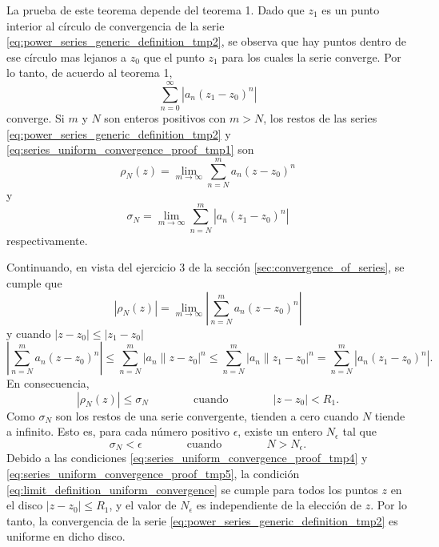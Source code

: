 \documentclass[a4paper]{report}
\begin{document}
La prueba de este teorema depende del teorema 1. Dado que \(z_1\) es un punto interior al círculo de convergencia de la serie \ref{eq:power_series_generic_definition_tmp2}, se observa que hay puntos dentro de ese círculo mas lejanos a \(z_0\) que el punto \(z_1\) para los cuales la serie converge. Por lo tanto, de acuerdo al teorema 1,
\begin{equation}\label{eq:series_uniform_convergence_proof_tmp1}
 \sum_{n=0}^\infty|a_n(z_1-z_0)^n| 
\end{equation}
converge. Si \(m\) y \(N\) son enteros positivos con \(m>N\), los restos de las series \ref{eq:power_series_generic_definition_tmp2} y \ref{eq:series_uniform_convergence_proof_tmp1} son
\begin{equation}\label{eq:series_uniform_convergence_proof_tmp2}
 \rho_N(z)=\lim_{m\to\infty}\sum_{n=N}^m a_n(z-z_0)^n 
\end{equation}
y
\begin{equation}\label{eq:series_uniform_convergence_proof_tmp3}
 \sigma_N=\lim_{m\to\infty}\sum_{n=N}^m|a_n(z_1-z_0)^n| 
\end{equation}
respectivamente.

Continuando, en vista del ejercicio 3 de la sección \ref{sec:convergence_of_series}, se cumple que
\[
 |\rho_N(z)|=\lim_{m\to\infty}\left|\sum_{n=N}^m a_n(z-z_0)^n\right|
\]
y cuando \(|z-z_0|\leq|z_1-z_0|\)
\[
 \left|\sum_{n=N}^m a_n(z-z_0)^n\right|\leq\sum_{n=N}^m|a_n\|z-z_0|^n\leq\sum_{n=N}^m|a_n\|z_1-z_0|^n=\sum_{n=N}^m|a_n(z_1-z_0)^n|.
\]
En consecuencia,
\begin{equation}\label{eq:series_uniform_convergence_proof_tmp4}
 |\rho_N(z)|\leq\sigma_N
 \qquad\qquad\textrm{cuando}\qquad\qquad
 |z-z_0|<R_1.
\end{equation}
Como \(\sigma_N\) son los restos de una serie convergente, tienden a cero cuando \(N\) tiende a infinito. Esto es, para cada número positivo \(\epsilon\), existe un entero \(N_\epsilon\) tal que 
\begin{equation}\label{eq:series_uniform_convergence_proof_tmp5}
 \sigma_N<\epsilon
 \qquad\qquad\textrm{cuando}\qquad\qquad
 N>N_\epsilon. 
\end{equation}
Debido a las condiciones \ref{eq:series_uniform_convergence_proof_tmp4} y \ref{eq:series_uniform_convergence_proof_tmp5}, la condición \ref{eq:limit_definition_uniform_convergence} se cumple para todos los puntos \(z\) en el disco \(|z-z_0|\leq R_1\), y el valor de \(N_\epsilon\) es independiente de la elección de \(z\). Por lo tanto, la convergencia de la serie \ref{eq:power_series_generic_definition_tmp2} es uniforme en dicho disco.
 
\end{document}
